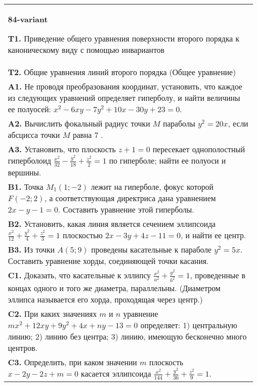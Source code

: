 \documentclass{article}
\begin{document}
\begin{tabular}{m{17cm}}
\textbf{84-variant}
\newline

\textbf{T1.} Приведение общего уравнения поверхности второго порядка к каноническому виду с помощью инвариантов \\
\textbf{T2.} Общие уравнения линий второго порядка (Общее уравнение) \\
\textbf{A1.} Не проводя преобразования координат, установить, что каждое из следующих уравнений определяет гиперболу, и найти величины ее полуосей: $x^2-6 x y-7 y^2+10 x-30 y+23=0$. \\
\textbf{A2.} Вычислить фокальный радиус точки $M$ параболы $y^2=20 x$, если абсцисса точки $M$ равна 7 . \\
\textbf{A3.} Установить, что плоскость $z+1=0$ пересекает однополостный гиперболоид $\frac{x^2}{32}-\frac{y^2}{18}+\frac{z^2}{2}=1$ по гиперболе; найти ее полуоси и вершины. \\
\textbf{B1.} Точка $M_1(1 ;-2)$ лежит на гиперболе, фокус которой $F(-2 ; 2)$, а соответствующая директриса дана уравнением $2 x-y-1=0$. Составить уравнение этой гиперболы. \\
\textbf{B2.} Установить, какая линия является сечением эллипсоида $\frac{x^2}{12}+\frac{y^2}{4}+\frac{z^2}{3}=1$ плоскостью $2 x-3 y+4 z-11=0$, и найти ее центр. \\
\textbf{B3.} Из точки $A(5 ; 9)$ проведены касательные к параболе $y^2=5 x$. Составить уравнение хорды, соединяющей точки касания. \\
\textbf{C1.} Доказать, что касательные к эллипсу $\frac{x^2}{a^2}+\frac{y^2}{b^2}=1$, проведенные в концах одного и того же диаметра, параллельны. (Диаметром эллипса называется его хорда, проходящая через центр.) \\
\textbf{C2.} При каких значениях $m$ и $n$ уравнение $m x^2+12 x y+9 y^2+4 x+n y-13=0$ определяет: 1) центральную линию; 2) линию без центра; 3) линию, имеющую бесконечно много центров. \\
\textbf{C3.} Определить, при каком значении $m$ плоскость $x-2 y-2 z+m=0$ касается эллипсоида $\frac{x^2}{144}+\frac{y^2}{36}+\frac{z^2}{9}=1$. \\

\end{tabular}
\vspace{1cm}
\end{document}

